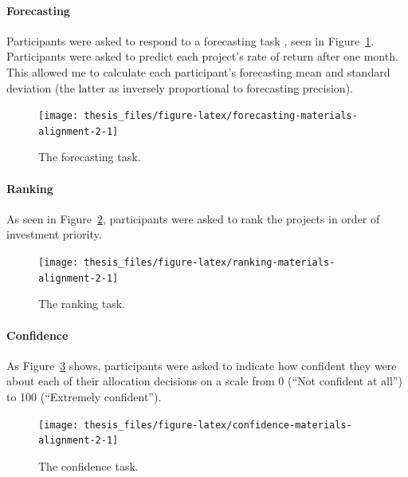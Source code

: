 \documentclass[a4paper, nobind, dvipsnames]{templates/ociamthesis}
\theoremstyle{definition}
\theoremstyle{definition}
\theoremstyle{definition}
\theoremstyle{definition}
\theoremstyle{remark}
\begin{document}
\hypertarget{forecasting-materials-alignment-2}{%
\paragraph{Forecasting}\label{forecasting-materials-alignment-2}}

Participants were asked to respond to a forecasting task \autocite[adapted from][]{long2018}, seen in Figure~\ref{fig:forecasting-materials-alignment-2}. Participants were asked to predict each project's rate of return after one month. This allowed me to calculate each participant's forecasting mean and standard deviation (the latter as inversely proportional to forecasting precision).



\begin{figure}
\texttt{[image: thesis\_files/figure-latex/forecasting-materials-alignment-2-1]} \caption{The forecasting task.}\label{fig:forecasting-materials-alignment-2}
\end{figure}

\hypertarget{ranking-materials-alignment-2}{%
\paragraph{Ranking}\label{ranking-materials-alignment-2}}

As seen in Figure~\ref{fig:ranking-materials-alignment-2}, participants were asked to rank the projects in order of
investment priority.



\begin{figure}
\texttt{[image: thesis\_files/figure-latex/ranking-materials-alignment-2-1]} \caption{The ranking task.}\label{fig:ranking-materials-alignment-2}
\end{figure}

\hypertarget{confidence-materials-alignment-2}{%
\paragraph{Confidence}\label{confidence-materials-alignment-2}}

As Figure~\ref{fig:confidence-materials-alignment-2} shows, participants were asked to indicate how confident they were about each of their allocation decisions on a scale from 0 (``Not confident at all'') to 100 (``Extremely confident'').



\begin{figure}
\texttt{[image: thesis\_files/figure-latex/confidence-materials-alignment-2-1]} \caption{The confidence task.}\label{fig:confidence-materials-alignment-2}
\end{figure}
\end{document}
